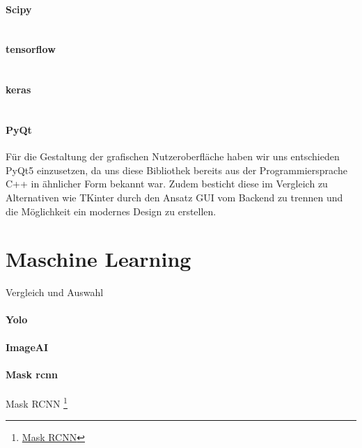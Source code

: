 \paragraph{Scipy}$~$\\
\paragraph{tensorflow}$~$\\
\paragraph{keras}$~$\\
\paragraph{PyQt} $~$\\
Für die Gestaltung der grafischen Nutzeroberfläche haben wir uns entschieden PyQt5 einzusetzen, da uns diese Bibliothek bereits aus der Programmiersprache C++ in ähnlicher Form bekannt war. Zudem besticht diese im Vergleich zu Alternativen wie TKinter durch den Ansatz GUI vom Backend zu trennen und die Möglichkeit ein modernes Design zu erstellen.

	
\section{Maschine Learning}
Vergleich und Auswahl
\paragraph{Yolo}
\paragraph{ImageAI}
\paragraph{Mask rcnn}
Mask RCNN \footnote{\href{https://github.com/matterport/Mask_RCNN}{Mask RCNN}}

